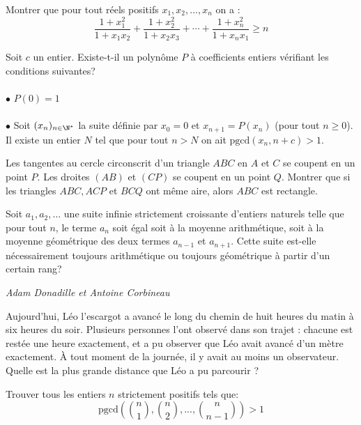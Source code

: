\begin{exo}{}
Montrer que pour tout réels positifs $x_1,x_2,...,x_n$ on a :
$$\frac{1+x_{1}^2}{1+x_{1}x_{2}}+\frac{1+x_{2}^2}{1+x_{2}x_{3}}+\cdots+\frac{1+x_{n}^2}{1+x_{n}x_{1}}\geq n$$
\end{exo}

\begin{exo}{}
Soit $c$ un entier. Existe-t-il un polynôme $P$ à coefficients entiers vérifiant les conditions suivantes?\\~~\\
$\bullet$ $P(0)=1$\\~~\\
$\bullet$ Soit $(x_n)_{n\in \N^*}$  la suite définie par $x_0=0$ et $x_{n+1}=P(x_n)$ (pour tout $n\ge 0$). Il existe un entier $N$ tel que pour tout $n>N$ on ait $\text{pgcd}(x_n,n+c)>1$.
\end{exo}

\begin{exo}{}
Les tangentes au cercle circonscrit d'un triangle $ABC$ en $A$ et $C$ se coupent en un point $P$. Les droites $(AB)$ et $(CP)$ se coupent en un point $Q$. Montrer que si les triangles $ABC,ACP$ et $BCQ$ ont même aire, alors $ABC$ est rectangle.
\end{exo}

\begin{exo}{}Soit $a_1,a_2,\ldots$ une suite infinie strictement croissante d'entiers naturels telle que pour tout $n$, le terme $a_n$ soit égal soit à la moyenne arithmétique, soit à la moyenne géométrique des deux termes $a_{n-1}$ et $a_{n+1}$. Cette suite est-elle nécessairement toujours arithmétique ou toujours géométrique à partir d'un certain rang?

\medskip
\textit{Adam Donadille et Antoine Corbineau}
\end{exo}

\begin{exo}{}
Aujourd'hui, Léo l'escargot a avancé le long du chemin de huit heures du matin à six heures du soir. Plusieurs personnes l'ont observé dans son trajet : chacune est restée une heure exactement, et a pu observer que Léo avait avancé d'un mètre exactement. \`{A} tout moment de la journée, il y avait au moins un observateur. Quelle est la plus grande distance que Léo a pu parcourir ?
\end{exo}


\begin{exo}{}
Trouver tous les entiers $n$ strictement positifs tels que:
$$\text{pgcd}\left(\binom{n}{1},\binom{n}{2},...,\binom{n}{n-1}\right)>1$$

\end{exo}


